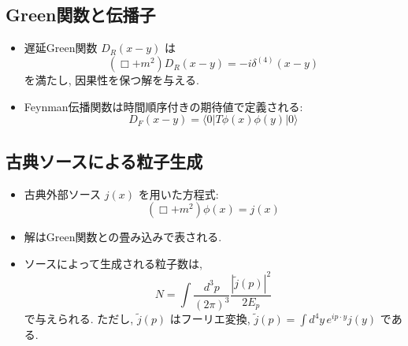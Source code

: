 \documentclass[a4paper,12pt]{article}
\begin{document}
\subsection*{Green関数と伝播子}
\begin{itemize}
  \item 遅延Green関数 $D_R(x - y)$ は
  \begin{equation*}
    (\Box + m^2) D_R(x - y) = -i \delta^{(4)}(x - y)
  \end{equation*}
  を満たし, 因果性を保つ解を与える.
  \item Feynman伝播関数は時間順序付きの期待値で定義される:
  \begin{equation*}
    D_F(x - y) = \langle 0 | T \phi(x) \phi(y) | 0 \rangle
  \end{equation*}
\end{itemize}

\subsection*{古典ソースによる粒子生成}
\begin{itemize}
  \item 古典外部ソース $j(x)$ を用いた方程式:
  \begin{equation*}
    (\Box + m^2)\phi(x) = j(x)
  \end{equation*}
  \item 解はGreen関数との畳み込みで表される.
  \item ソースによって生成される粒子数は,
  \begin{equation*}
    N = \int \frac{d^3p}{(2\pi)^3} \frac{|\tilde{j}(p)|^2}{2E_p}
  \end{equation*}
  で与えられる. ただし, $\tilde{j}(p)$ はフーリエ変換, $\displaystyle \tilde{j}(p) = \int d^4 y\, e^{ip \cdot y} j(y)$ である.
\end{itemize}

\color{black}
\end{document}
